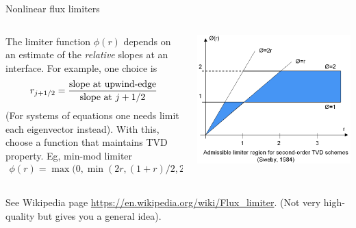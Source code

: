 \documentclass[aspectratio=169]{beamer}
\begin{document}
\begin{frame}{Nonlinear flux limiters}
  \small
  \begin{columns}
    \begin{column}{0.5\linewidth}
      The limiter function $\phi(r)$ depends on an estimate of the
      \emph{relative} slopes at an interface. For example, one choice
      is
      \begin{align*}
        r_{j+1/2} = \frac{\textrm{\textrm{slope at upwind-edge}}}{\textrm{slope at } j+1/2}
      \end{align*}
      (For systems of equations one needs limit each eigenvector
      instead). With this, choose a function that maintains TVD
      property. Eg, min-mod limiter
      \begin{align*}
        \phi(r) = \max\big(0, \min(2r, (1+r)/2,2) \big).
      \end{align*}
    \end{column}
    
    \begin{column}{0.5\linewidth}
      \includegraphics[width=\linewidth]{LimiterRegion.png}
    \end{column}
  \end{columns}
  See Wikipedia page
  \url{https://en.wikipedia.org/wiki/Flux_limiter}. (Not very
  high-quality but gives you a general idea).
\end{frame}
\end{document}
